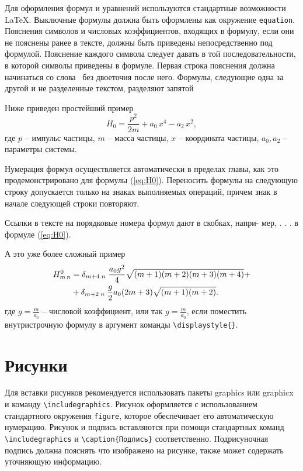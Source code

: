 Для оформления формул и уравнений используются стандартные возможности \LaTeX.
Выключные формулы должна быть оформлены как окружение \verb|equation|. Пояснения символов и числовых коэффициентов, 
входящих в формулу, если они не пояснены ранее в тексте,
должны быть приведены непосредственно под формулой. Пояснение каждого
символа следует давать в той последовательности, в которой
символы приведены в формуле. Первая строка пояснения должна начинаться
со слова  \guillemotright\ без двоеточия после него.
Формулы, следующие одна за другой и не разделенные текстом, разделяют запятой

Ниже приведен простейший пример
\begin{equation}\label{eq:H0}
H_0 = \frac{p^2}{2 m} + a_0\, x^4 - a_2\, x^2,
\end{equation}
где  $p$ -- импульс частицы, $m$ -- масса частицы, $x$ -- координата частицы, $a_0, a_2$ -- параметры системы.

Нумерация формул осуществляется автоматически в пределах главы, как это
продемонстрировано для формулы (\ref{eq:H0}).
Переносить формулы на следующую строку допускается только на знаках выполняемых операций,
причем знак в начале следующей строки повторяют. 

Ссылки в тексте на порядковые номера формул дают в скобках, напри-
мер, . . . в формуле (\ref{eq:H0}).

А это уже более сложный пример
\begin{align}
H^0_{m\, n} & = \delta_{m + 4 \; n} \;\frac{a_0 g^2}{4} \sqrt{(m + 1)(m + 2)(m +
3)(m +
4)} +\notag\\
 & + \delta_{m + 2 \; n} \;\frac{g}{2} a_0  (2 m + 3) \sqrt{(m
+ 1)(m  + 2)}.\label{eq:Hmn}
\end{align}
где $g = \frac{m}{a_0}$ -- числовой коэффициент, или так $\displaystyle{g = \frac{m}{a_0}}$, если поместить внутристрочную формулу в аргумент команды \verb|\displaystyle{}|.



\section{Рисунки}

Для вставки рисунков рекомендуется использовать пакеты graphics или graphicx и команду
\verb|\includegraphics|. Рисунок оформляется с использованием стандартного окружения \verb|figure|, которое обеспечивает его автоматическую нумерацию. Рисунок и подпись вставляются при помощи стандартных команд \verb|\includegraphics| и \verb|\caption{Подпись}| соответственно. Подрисуночная подпись должна пояснять что изображено на рисунке, также может содержать уточняющую информацию. 

